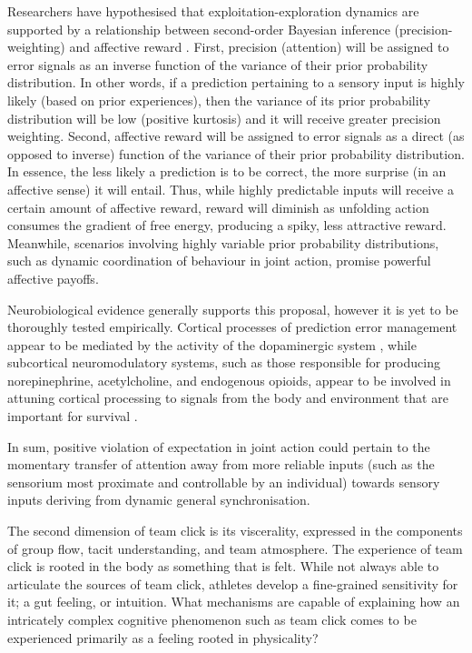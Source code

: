 \begin{CJK}{UTF8}{gbsn}
Researchers have hypothesised that exploitation-exploration dynamics are supported by a relationship between second-order Bayesian inference (precision-weighting) and affective reward  \citep{Friston2012,Chetverikov2016}.  First, precision (attention) will be assigned to error signals as an inverse function of the variance of their prior probability distribution.  In other words, if a prediction pertaining to a sensory input is highly likely (based on prior experiences), then the variance of its prior probability distribution will be low (positive kurtosis) and it will receive greater precision weighting.  Second, affective reward will be assigned to error signals as a direct (as opposed to inverse) function of the variance of their prior probability distribution. In essence, the less likely a prediction is to be correct, the more surprise (in an affective sense) it will entail.  Thus, while highly predictable inputs will receive a certain amount of affective reward, reward will diminish as unfolding action consumes the gradient of free energy, producing a spiky, less attractive reward.  Meanwhile, scenarios involving highly variable prior probability distributions, such as dynamic coordination of behaviour in joint action, promise powerful affective payoffs.

Neurobiological evidence generally supports this proposal, however it is yet to be thoroughly tested empirically.  Cortical processes of prediction error management appear to be mediated by the activity of the dopaminergic system \citep{Friston2012,Kakade2002,Schultz2016}, while subcortical neuromodulatory systems, such as those responsible for producing norepinephrine, acetylcholine, and endogenous opioids, appear to be involved in attuning cortical processing to signals from the body and environment that are important for survival \citep{Lewis2005}.

In sum, positive violation of expectation in joint action could pertain to the momentary transfer of attention away from more reliable inputs (such as the sensorium most proximate and controllable by an individual) towards sensory inputs deriving from dynamic general synchronisation.


The second dimension of team click is its viscerality, expressed in the components of group flow, tacit understanding, and team atmosphere.  The experience of team click is rooted in the body as something that is felt.  While not always able to articulate the sources of team click, athletes develop a fine-grained sensitivity for it; a gut feeling, or intuition.  What mechanisms are capable of explaining how an intricately complex cognitive phenomenon such as team click comes to be experienced primarily as a feeling rooted in physicality?


\end{CJK}
